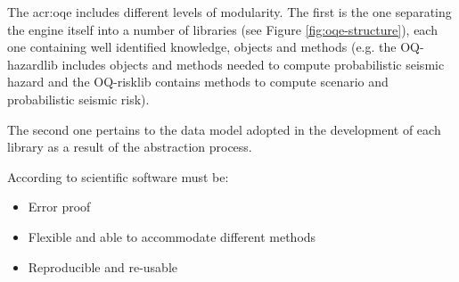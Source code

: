 The \gls{acr:oqe} includes different levels of modularity. The first is the one separating the engine itself into a number of libraries (see Figure \ref{fig:oqe-structure}), each one containing well identified knowledge, objects and methods (e.g. the OQ-hazardlib  includes objects and methods needed to compute probabilistic seismic hazard and the OQ-risklib contains methods to compute scenario and probabilistic seismic risk).

The second one pertains to the data model adopted in the development of each library as a result of the abstraction process.

According to \textcite{berkes2012} scientific software must be:
\begin{itemize}
\item Error proof
\item Flexible and able to accommodate different methods
\item Reproducible and re-usable
\end{itemize}